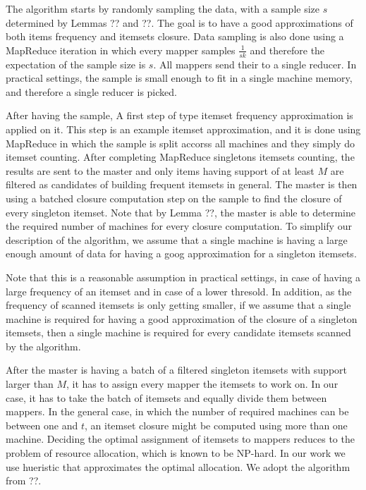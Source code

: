 The algorithm starts by randomly sampling the data, with a 
sample size $s$ determined by Lemmas ?? and ??. The goal is 
to have a good approximations of both items frequency and 
itemsets closure. Data sampling is also done using a MapReduce 
iteration in which every mapper samples $\frac{1}{sk}$ and 
therefore the expectation of the sample size is $s$. All 
mappers send their to a single reducer. In practical settings, 
the sample is small enough to fit in a single machine memory, 
and therefore a single reducer is picked.

After having the sample, A first step of type itemset
frequency approximation is applied on it. This step is an
example itemset approximation, and it is done using MapReduce in which the
sample is split accorss all machines and they simply do
itemset counting. After completing MapReduce singletons
itemsets counting, the results are sent to the master and
only items having support of at least $M$ are filtered as
candidates of building frequent itemsets in general. The
master is then using a batched closure computation step on
the sample to find the closure of every singleton itemset.
Note that by Lemma ??, the master is able to determine the
required number of machines for every closure computation.
To simplify our description of the algorithm, we assume that
a single machine is having a large enough amount of data for
having a goog approximation for a singleton itemsets.

Note that this is a reasonable assumption in practical
settings, in case of having a large frequency of an itemset
and in case of a lower thresold. In addition, as the
frequency of scanned itemsets is only getting smaller, if we
assume that a single machine is required for having a good
approximation of the closure of a singleton itemsets, then a
single machine is required for every candidate itemsets
scanned by the algorithm.

After the master is having a batch of a filtered
singleton itemsets with support larger than $M$, it has
to assign every mapper the itemsets to work on. In our
case, it has to take the batch of itemsets and equally
divide them between mappers. In the general case, in
which the number of required machines can be between one
and $t$, an itemset closure might be computed using more
than one machine. Deciding the optimal assignment of
itemsets to mappers reduces to the problem of resource
allocation, which is known to be NP-hard. In our work we
use hueristic that approximates the optimal allocation. We
adopt the algorithm from ??.

